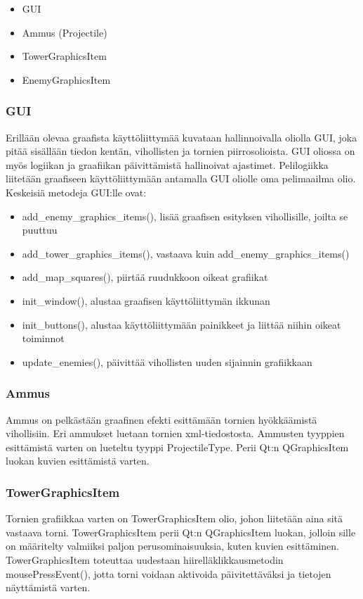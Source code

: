 \documentclass{article}
\begin{document}
\begin{itemize}
    \item GUI
    \item Ammus (Projectile)
    \item TowerGraphicsItem
    \item EnemyGraphicsItem
\end{itemize}

\subsubsection{GUI}
Erillään olevaa graafista käyttöliittymää kuvataan hallinnoivalla oliolla GUI, joka pitää sisällään tiedon kentän, vihollisten ja tornien piirrosolioista. GUI oliossa on myös logiikan ja graafiikan päivittämistä hallinoivat ajastimet. Pelilogiikka liitetään graafiseen käyttöliittymään antamalla GUI oliolle oma pelimaailma olio. \\

\noindent Keskeisiä metodeja GUI:lle ovat:

\begin{itemize}
    \item add\_enemy\_graphics\_items(), lisää graafisen esityksen vihollisille, joilta se puuttuu
    \item add\_tower\_graphics\_items(), vastaava kuin add\_enemy\_graphics\_items()
    \item add\_map\_squares(), piirtää ruudukkoon oikeat grafiikat
    \item init\_window(), alustaa graafisen käyttöliittymän ikkunan
    \item init\_buttons(), alustaa käyttöliittymään painikkeet ja liittää niihin oikeat toiminnot
    \item update\_enemies(), päivittää vihollisten uuden sijainnin grafiikkaan
\end{itemize}

\subsubsection{Ammus}
Ammus on pelkästään graafinen efekti esittämään tornien hyökkäämistä vihollisiin. Eri ammukset luetaan tornien xml-tiedostosta. Ammusten tyyppien esittämistä varten on lueteltu tyyppi ProjectileType. Perii Qt:n QGraphicsItem luokan kuvien esittämistä varten.

\subsubsection{TowerGraphicsItem}
Tornien grafiikkaa varten on TowerGraphicsItem olio, johon liitetään aina sitä vastaava torni. TowerGraphicsItem perii Qt:n QGraphicsItem luokan, jolloin sille on määritelty valmiiksi paljon perusominaisuuksia, kuten kuvien esittäminen. TowerGraphicsItem toteuttaa uudestaan hiirelläklikkausmetodin mousePressEvent(), jotta torni voidaan aktivoida päivitettäväksi ja tietojen näyttämistä varten.
\end{document}

